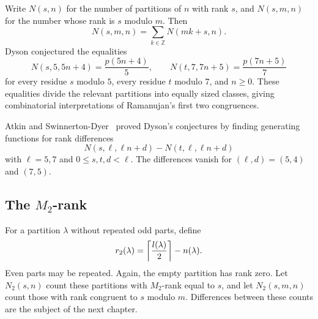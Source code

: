 Write $N(s,n)$ for the number of partitions of $n$ with rank $s$, and
$N(s,m,n)$ for the number whose rank is $s$ modulo $m$. Then
\[
 N(s,m,n)=\sum_{k\in\mathbb Z}N(mk+s,n).
\]
Dyson conjectured the equalities
\[
 N(s,5,5n+4)=\frac{p(5n+4)}5,\qquad
 N(t,7,7n+5)=\frac{p(7n+5)}7
\]
for every residue $s$ modulo $5$, every residue $t$ modulo $7$, and $n\ge0$.
These equalities divide the relevant partitions into equally sized classes,
giving combinatorial interpretations of Ramanujan's first two congruences.

Atkin and Swinnerton-Dyer~\cite{atkin1954} proved Dyson's conjectures by
finding generating functions for rank differences
\[
 N(s,\ell,\ell n+d)-N(t,\ell,\ell n+d)
\]
with $\ell=5,7$ and $0\le s,t,d<\ell$. The differences vanish for
$(\ell,d)=(5,4)$ and $(7,5)$.

\subsection{The \texorpdfstring{$M_2$}{M2}-rank}
For a partition $\lambda$ without repeated odd parts, define
\[
 r_2(\lambda)=\ceil*{\frac{l(\lambda)}2}-n(\lambda).
\]
Even parts may be repeated. Again, the empty partition has rank zero.
Let $N_2(s,n)$ count these partitions with $M_2$-rank equal to $s$, and
let $N_2(s,m,n)$ count those with rank congruent to $s$ modulo $m$.
Differences between these counts are the subject of the next chapter.
